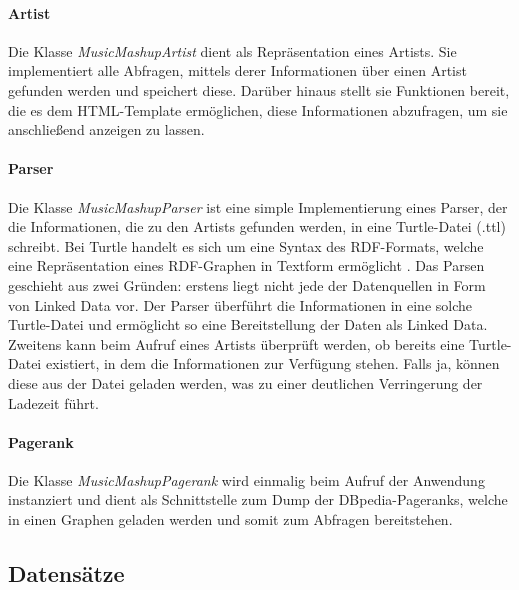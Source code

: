 \paragraph{Artist} Die Klasse \textit{MusicMashupArtist} dient als Repräsentation eines Artists. Sie implementiert alle Abfragen, mittels derer Informationen über einen Artist gefunden werden und speichert diese. Darüber hinaus stellt sie Funktionen bereit, die es dem HTML-Template ermöglichen, diese Informationen abzufragen, um sie anschließend anzeigen zu lassen.


\paragraph{Parser} Die Klasse \textit{MusicMashupParser} ist eine simple Implementierung eines Parser, der die Informationen, die zu den Artists gefunden werden, in eine Turtle-Datei (.ttl) schreibt. Bei Turtle handelt es sich um eine Syntax des RDF-Formats, welche eine Repräsentation eines RDF-Graphen in Textform ermöglicht \cite{turtle}. Das Parsen geschieht aus zwei Gründen: erstens liegt nicht jede der Datenquellen in Form von Linked Data vor. Der Parser überführt die Informationen in eine solche Turtle-Datei und ermöglicht so eine Bereitstellung der Daten als Linked Data.  Zweitens kann beim Aufruf eines Artists überprüft werden, ob bereits eine Turtle-Datei existiert, in dem die Informationen zur Verfügung stehen. Falls ja, können diese aus der Datei geladen werden, was zu einer deutlichen Verringerung der Ladezeit führt.


\paragraph{Pagerank} Die Klasse \textit{MusicMashupPagerank} wird einmalig beim Aufruf der Anwendung instanziert und dient als Schnittstelle zum Dump der DBpedia-Pageranks, welche in einen Graphen geladen werden und somit zum Abfragen bereitstehen.

\subsection{Datensätze}


